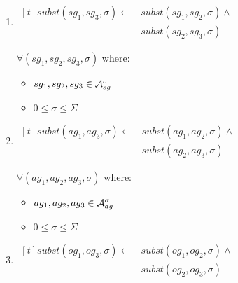 \documentclass[10pt, twocolumn]{article}
\begin{document}
            \begin{enumerate}
              \item
                \begin{math}
                  \begin{aligned}[t]
                    subst(sg_{1}, sg_{3}, \sigma) \leftarrow &
                    subst(sg_{1}, sg_{2}, \sigma) \land \\
                    & subst(sg_{2}, sg_{3}, \sigma)
                  \end{aligned}
                \end{math}

                $\forall (sg_{1}, sg_{2}, sg_{3}, \sigma)$ where:

                \begin{itemize}
                  \item
                    $sg_{1}, sg_{2}, sg_{3} \in {\cal A}^{\sigma}_{sg}$
                  \item
                    $0 \leq \sigma \leq \Sigma$
                \end{itemize}
              \item
                \begin{math}
                  \begin{aligned}[t]
                    subst(ag_{1}, ag_{3}, \sigma) \leftarrow &
                    subst(ag_{1}, ag_{2}, \sigma) \land \\
                    & subst(ag_{2}, ag_{3}, \sigma)
                  \end{aligned}
                \end{math}

                $\forall (ag_{1}, ag_{2}, ag_{3}, \sigma)$ where:

                \begin{itemize}
                  \item
                    $ag_{1}, ag_{2}, ag_{3} \in {\cal A}^{\sigma}_{ag}$
                  \item
                    $0 \leq \sigma \leq \Sigma$
                \end{itemize}
              \item
                \begin{math}
                  \begin{aligned}[t]
                    subst(og_{1}, og_{3}, \sigma) \leftarrow &
                    subst(og_{1}, og_{2}, \sigma) \land \\
                    & subst(og_{2}, og_{3}, \sigma)
                  \end{aligned}
                \end{math}


\end{enumerate}
\end{document}
